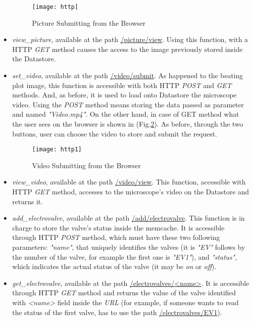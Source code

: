 \begin{itemize}
 	\begin{figure}[h]
 		\centering
 		\texttt{[image: http]}
 		\caption{Picture Submitting from the Browser}
 		\label{Fig:http}	
 	\end{figure}
 	
 	\item \textit{view\_picture}, available at the path \url{/picture/view}. Using this function, with a HTTP \textit{GET} method causes the access to the image previously stored inside the Datastore.
 	\item \textit{set\_video}, available at the path \url{/video/submit}. As happened to the beating plot image, this function is accessible with both HTTP \textit{POST} and \textit{GET} methods. And, as before, it is used to load onto Datastore the microscope video. Using the \textit{POST} method means storing the data passed as parameter and named \textit{"Video.mp4"}. On the other hand, in case of GET method what the user sees on the browser is shown in (Fig.\ref{Fig:http1}). As before, through the two buttons, user can choose the video to store and submit the request.
 	
 	\begin{figure}[h]
 		\centering
 		\texttt{[image: http1]}
 		\caption{Video Submitting from the Browser}
 		\label{Fig:http1}	
 	\end{figure}
 	
 	\item \textit{view\_video}, available at the path \url{/video/view}. This function, accessible with HTTP \textit{GET} method, accesses to the microscope's video on the Datastore and returns it.
 	
 	\item  \textit{add\_electrovalve}, available at the path \url{/add/electrovalve}. This function is in charge to store the valve's status inside the memcache. It is accessible through HTTP \textit{POST} method, which must have these two following parameters:\textit{ "name"}, that uniquely identifies the valves (it is \textit{"EV"} follows by the number of the valve, for example the first one is \textit{"EV1"}), and \textit{"status"}, which indicates the actual status of the valve (it may be \textit{on} or \textit{off}).
 	
 	\item \textit{get\_electrovalve}, available at the path \url{/electrovalves/<name>}. It is accessible through HTTP \textit{GET} method and returns the value of the valve identified with \textit{<name>} field inside the \textit{URL} (for example, if someone wants to read the status of the first valve, has to use the path \url{/electrovalves/EV1}).
 	
 	
 	
 \end{itemize}
 